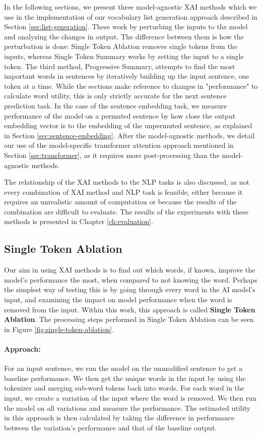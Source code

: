 In the following sections, we present three model-agnostic XAI methods which we use in the implementation of our vocabulary list generation approach described in Section \ref{sec:list-generation}.
These work by perturbing the inputs to the model and analyzing the changes in output.
The difference between them is how the perturbation is done:
Single Token Ablation removes single tokens from the inputs, whereas Single Token Summary works by setting the input to a single token.
The third method, Progressive Summary, attempts to find the most important words in sentences by iteratively building up the input sentence, one token at a time.
While the sections make reference to changes in "performance" to calculate word utility, this is only strictly accurate for the next sentence prediction task.
In the case of the sentence embedding task, we measure performance of the model on a permuted sentence by how close the output embedding vector is to the embedding of the unpermuted sentence, as explained in Section \ref{sec:sentence-embedding}.
After the model-agnostic methods, we detail our use of the model-specific transformer attention approach mentioned in Section \ref{sec:transformer}, as it requires more post-processing than the model-agnostic methods.

The relationship of the XAI methods to the NLP tasks is also discussed, as not every combination of XAI method and NLP task is feasible, either because it requires an unrealistic amount of computation or because the results of the combination are difficult to evaluate.
The results of the experiments with these methods is presented in Chapter \ref{ch:evaluation}.


\subsection{Single Token Ablation}
Our aim in using XAI methods is to find out which words, if known, improve the model's performance the most, when compared to not knowing the word.
Perhaps the simplest way of testing this is by going through every word in the AI model's input, and examining the impact on model performance when the word is removed from the input.
Within this work, this approach is called \textbf{Single Token Ablation}.
The processing steps performed in Single Token Ablation can be seen in Figure \ref{fig:single-token-ablation}.

\paragraph{Approach:}
For an input sentence, we run the model on the unmodified sentence to get a baseline performance.
We then get the unique words in the input by using the tokenizer and merging sub-word tokens back into words.
For each word in the input, we create a variation of the input where the word is removed.
We then run the model on all variations and measure the performance.
The estimated utility in this approach is then calculated by taking the difference in performance between the variation's performance and that of the baseline output.


